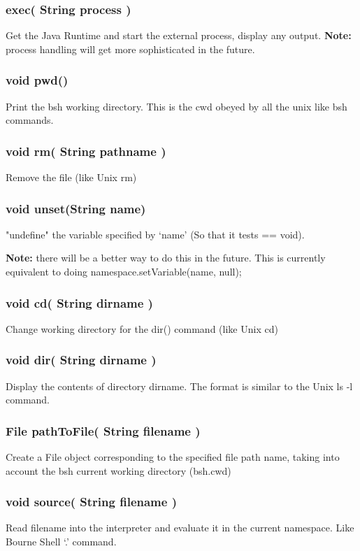 \documentclass[twoside,11pt,nolof]{starlink}
\begin{document}
\subsubsection*{exec( String process )}
Get the Java Runtime and start the external process, display any
output. \textbf{Note:} process handling will get more sophisticated in the
future.

\subsubsection*{void pwd()}
Print the bsh working directory.  This is the cwd obeyed by all the unix
like bsh commands.

\subsubsection*{void rm( String pathname )}
Remove the file (like Unix rm)

\subsubsection*{void unset(String name)}
"undefine" the variable specified by `name' (So that it tests == void).

\textbf{Note:} there will be a better way to do this in the future.  This is
currently equivalent to doing namespace.setVariable(name, null);

\subsubsection*{void cd( String dirname )}
Change working directory for the dir() command (like Unix cd)

\subsubsection*{void dir( String dirname )}
Display the contents of directory dirname. The format is similar to
the Unix ls -l command.

\subsubsection*{File pathToFile( String filename )}
Create a File object corresponding to the specified file path name, taking
into account the bsh current working directory (bsh.cwd)

\subsubsection*{void source( String filename )}
Read filename into the interpreter and evaluate it in the current
namespace.  Like Bourne Shell `.' command.
\end{document}
